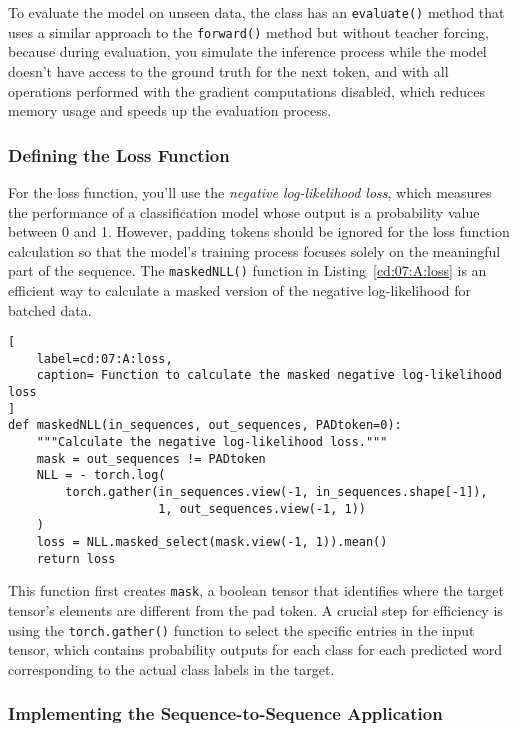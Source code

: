 To evaluate the model on unseen data, the class has an \lstinline{evaluate()} method that uses a similar approach to the \lstinline{forward()} method but without teacher forcing, because during evaluation, you simulate the inference process while the model doesn't have access to the ground truth for the next token, and with all operations performed with the gradient computations disabled, which reduces memory usage and speeds up the evaluation process.

\subsubsection{Defining the Loss Function}

For the loss function, you'll use the \emph{negative log-likelihood loss}, which measures the performance of a classification model whose output is a probability value between 0 and 1.
However, padding tokens should be ignored for the loss function calculation so that the model's training process focuses solely on the meaningful part of the sequence.
The \lstinline{maskedNLL()} function in Listing~\ref{cd:07:A:loss} is an efficient way to calculate a masked version of the negative log-likelihood for batched data. 
\begin{lstlisting}[
    label=cd:07:A:loss,
    caption= Function to calculate the masked negative log-likelihood loss
]
def maskedNLL(in_sequences, out_sequences, PADtoken=0):
    """Calculate the negative log-likelihood loss."""
    mask = out_sequences != PADtoken
    NLL = - torch.log(
        torch.gather(in_sequences.view(-1, in_sequences.shape[-1]), 
                     1, out_sequences.view(-1, 1))
    )
    loss = NLL.masked_select(mask.view(-1, 1)).mean()
    return loss
\end{lstlisting}
This function first creates \lstinline{mask}, a boolean tensor that identifies where the target tensor’s elements are different from the pad token. 
A crucial step for efficiency is using the \lstinline{torch.gather()} function to select the specific entries in the input tensor, which contains probability outputs for each class for each predicted word corresponding to the actual class labels in the target.

\subsubsection{Implementing the Sequence-to-Sequence Application}

